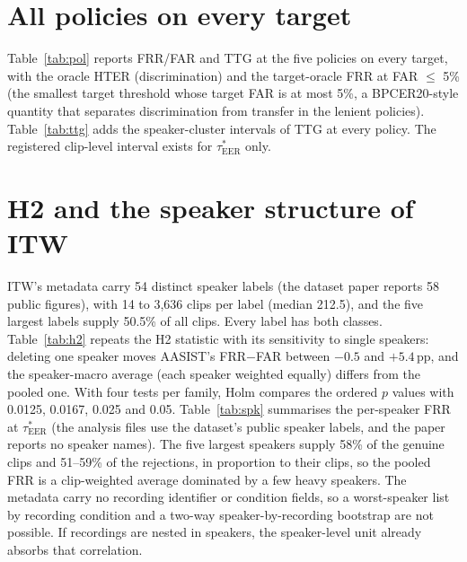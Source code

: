 \documentclass[10pt]{article}
\newcommand{\tauE}{\tau^{*}_{\mathrm{EER}}}
\newcommand{\wide}[1]{\begingroup\footnotesize\setlength{\tabcolsep}{3.5pt}\resizebox{\textwidth}{!}{}\endgroup}
\begin{document}
\begin{table}[!ht]
\caption{Band and miss at \(\tauE\): in SD units of the target scores (not comparable across score parametrisations) and in rank terms
(share of target clips, comparable).}
\label{tab:band}
\centering
\footnotesize

\end{table}

\section{All policies on every target}
Table~\ref{tab:pol} reports FRR/FAR and TTG at the five policies on every target, with the oracle HTER (discrimination) and the
target-oracle FRR at FAR \(\le\) 5\% (the smallest target threshold whose target FAR is at most 5\%, a BPCER20-style quantity that separates
discrimination from transfer in the lenient policies). Table~\ref{tab:ttg} adds the speaker-cluster intervals of TTG at every policy. The registered clip-level interval exists for \(\tauE\) only.

\begin{table}[!ht]
\caption{FRR/FAR (\%) and TTG (pp) at the five frozen policies, the oracle HTER (\%), and the FRR (\%) at the smallest target threshold with target FAR
\(\le 5\)\%.}
\label{tab:pol}
\centering
\wide{s_tab_policies}
\end{table}

\begin{table}[!ht]
\caption{TTG (pp) with the speaker-cluster 95\% interval (\(B=1000\), seed 0) at every policy, and the registered clip-level interval at \(\tauE\).}
\label{tab:ttg}
\centering
\wide{s_tab_ttg_spk}
\end{table}

\section{H2 and the speaker structure of ITW}
ITW's metadata carry 54 distinct speaker labels (the dataset paper reports 58 public figures), with 14 to 3,636 clips per label (median 212.5), and the five largest labels supply 50.5\% of all clips. Every label has both classes. Table~\ref{tab:h2} repeats the H2 statistic with its
sensitivity to single speakers: deleting one speaker moves AASIST's FRR\(-\)FAR between \(-0.5\) and \(+5.4\)\,pp, and the speaker-macro average (each speaker weighted equally) differs from the pooled one. With four tests per family, Holm compares the ordered \(p\) values with 0.0125, 0.0167, 0.025 and 0.05. Table~\ref{tab:spk} summarises the per-speaker FRR at \(\tauE\)
(the analysis files use the dataset's public speaker labels, and the paper reports no speaker names). The five largest speakers supply 58\% of
the genuine clips and 51--59\% of the rejections, in proportion to their clips, so the pooled FRR is a clip-weighted average dominated by a
few heavy speakers. The metadata carry no recording identifier or condition fields, so a worst-speaker list by recording condition and a
two-way speaker-by-recording bootstrap are not possible. If recordings are nested in speakers, the speaker-level unit already absorbs
that correlation.
\end{document}
